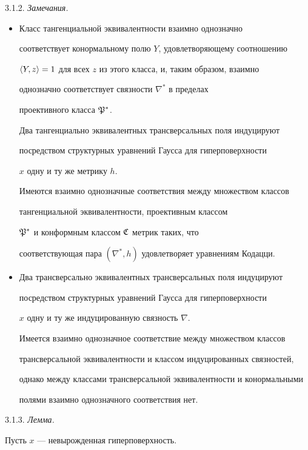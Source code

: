 3.1.2. {\it Замечания.}


\begin{itemize}


\item[(i)]


Класс тангенциальной эквивалентности взаимно однозначно


соответствует конормальному полю $Y$, удовлетворяющему соотношению


$\langle Y,z\rangle=1$ для всех $z$ из этого класса, и, таким образом, взаимно


однозначно соответствует связности $\nabla^*$ в пределах


проективного класса $\frak P^*$.


Два тангенциально эквивалентных трансверсальных поля индуцируют


посредством структурных уравнений Гаусса для гиперповерхности


$x$ одну и ту же метрику $h$.


Имеются взаимно однозначные соответствия между множеством классов


тангенциальной эквивалентности, проективным классом


$\frak P^*$ и конформным классом $\frak C$ метрик таких, что


соответствующая пара $(\nabla^*,h)$ удовлетворяет уравнениям Кодацци.


\item[(ii)]


Два трансверсально эквивалентных трансверсальных поля индуцируют


посредством структурных уравнений Гаусса для гиперповерхности


$x$ одну и ту же индуцированную связность $\nabla$.


Имеется взаимно однозначное соответствие между множеством классов


трансверсальной эквивалентности и классом индуцированных связностей,


однако между классами трансверсальной эквивалентности и конормальными


полями взаимно однозначного соответствия нет.


\end{itemize}





3.1.3. {\it Лемма.}


Пусть $x$ --- невырожденная гиперповерхность.


